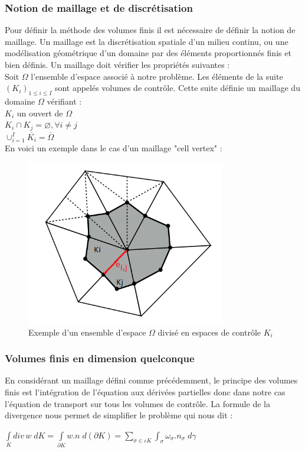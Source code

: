 \documentclass[12pt]{article}
\begin{document}
\subsubsection{Notion de maillage et de discrétisation}

\noindent Pour définir la méthode des volumes finis il est nécessaire de définir la notion de maillage.
Un maillage est la discrétisation spatiale d'un milieu continu, ou une modélisation géométrique d'un domaine par des éléments proportionnés finis et bien définis. Un maillage doit vérifier les propriétés suivantes :
\\Soit $\Omega$ l'ensemble d'espace associé à notre problème. 
Les éléments de la suite $(K_i)_{1\leq{i}\leq{I}}$ sont appelés volumes de contrôle. Cette suite définie un maillage du domaine $\Omega$  vérifiant :
\\$K_i$ un ouvert de $\Omega$
\\$K_i \cap K_j = \varnothing, \forall i \neq j$
\\$ \cup_{i=1}^{I} \overline{K_i} = \overline{\Omega}$
\\


\noindent En voici un exemple dans le cas d'un maillage "cell vertex" :

    \begin{figure}[H]
	\centering
	\includegraphics[scale=0.5]{Ki.png}
	\caption{Exemple d'un ensemble d'espace $\Omega$ divisé en espaces de contrôle $K_i$}
	\label{Ki}
	\end{figure}

\subsubsection{Volumes finis en dimension quelconque}
\noindent En considérant un maillage défini comme précédemment, le principe des volumes finis est l'intégration de l'équation aux dérivées partielles donc dans notre cas l'équation de transport sur tous les volumes de contrôle. 
La formule de la divergence nous permet de simplifier le problème qui nous dit :
\\
\begin{center}
    $\displaystyle\int\limits_{K} div\, w \; dK=\int\limits_{\partial{K}} w.n \; d(\partial{K}) = \displaystyle\sum_{\sigma \in \varepsilon{K}} \int_{\sigma} \omega_{\sigma}.n_{\sigma} \; d\gamma$
\end{center}
\end{document}
